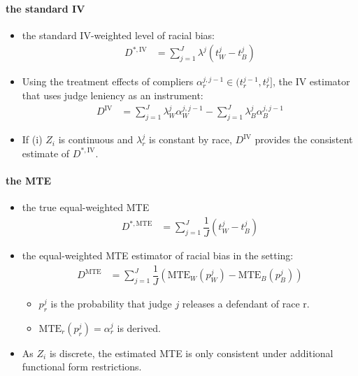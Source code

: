 \documentclass[../root]{subfiles}
\begin{document}
    \paragraph{the standard IV}

    \begin{itemize}
      \item the standard IV-weighted level of racial bias:
      \begin{align*}
        D^{*, \text{IV}} &= \sum_{j = 1}^J \lambda^j \left( t_W^j - t_B^j \right)
      \end{align*}
      \item Using the treatment effects of compliers $\alpha_r^{j, j - 1} \in (t_r^{j - 1}, t_r^j]$, the IV estimator that uses judge leniency as an instrument:
      \begin{align*}
        D^{\text{IV}} &= \sum_{j = 1}^J \lambda^j_W \alpha_W^{j, j - 1} - \sum_{j = 1}^J \lambda^j_B \alpha_B^{j, j - 1}
      \end{align*}
      \item If (i) $Z_i$ is continuous and $\lambda_r^j$ is constant by race, $D^{\text{IV}}$ provides the consistent estimate of $D^{*, \text{IV}}$.
    \end{itemize}


    \paragraph{the MTE}

    \begin{itemize}
      \item the true equal-weighted MTE
      \begin{align*}
        D^{*, \text{MTE}} &= \sum_{j = 1}^J \dfrac{1}{J} \left( t_W^j - t_B^j \right)
      \end{align*}
      \item the equal-weighted MTE estimator of racial bias in the setting:
      \begin{align*}
        D^{\text{MTE}} &= \sum_{j = 1}^J \dfrac{1}{J} \left( \text{MTE}_W(p_W^j) - \text{MTE}_B(p_B^j) \right)
      \end{align*}
      \begin{itemize}
        \item $p_r^j$ is the probability that judge $j$ releases a defendant of race r.
        \item $\text{MTE}_r(p_r^j) = \alpha_r^j$ is derived.
      \end{itemize}
      \item As $Z_i$ is discrete, the estimated MTE is only consistent under additional functional form restrictions.
    \end{itemize}
\end{document}
